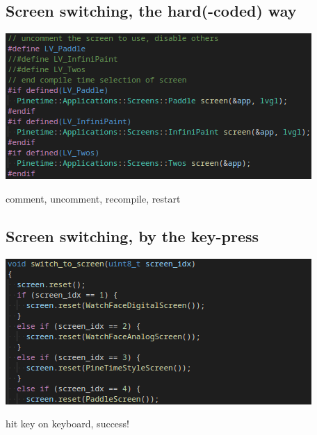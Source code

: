 \documentclass{beamer}
\begin{document}
\subsection{Screen switching, the hard(-coded) way}
\begin{frame}{}
  \centering\includegraphics[width=\textwidth]{../switching_screens_hard_coded}

  comment, uncomment, recompile, restart
\end{frame}

\subsection{Screen switching, by the key-press}
\begin{frame}{}
  \centering\includegraphics[width=\textwidth]{../switching_screens_function}

  hit key on keyboard, success!
\end{frame}
\end{document}
